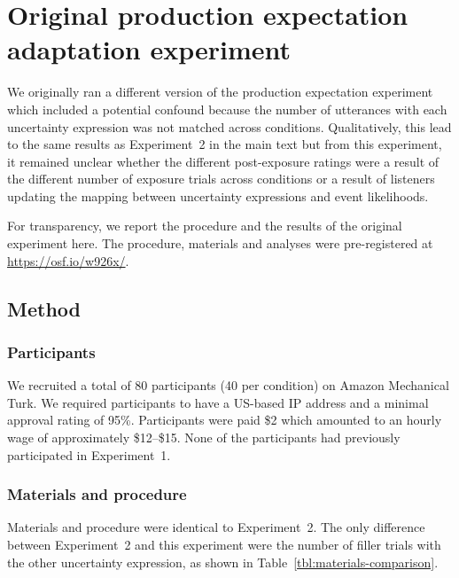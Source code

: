 \chapter[Original adaptation experiment]{Original production expectation adaptation experiment}


We originally ran a different version of the production expectation experiment which included a potential confound because the number of utterances
with each uncertainty expression was not matched across conditions. Qualitatively, this lead to the same results as Experiment~2 in the main text 
but from this experiment, it remained unclear whether the different post-exposure ratings were a result of the different number of exposure trials
across conditions or a result of listeners updating the mapping between uncertainty expressions and event likelihoods.  

For transparency, we report the procedure and the results of the original experiment here. The procedure, materials and analyses were pre-registered at \url{https://osf.io/w926x/}.

\section{Method}
\subsection{Participants}
We recruited a total of 80 participants (40 per condition) on Amazon Mechanical Turk. 
We required participants to have a US-based IP address and a minimal approval rating 
of 95\%. Participants were paid \$2 which amounted to an hourly wage of approximately 
\$12--\$15. None of the participants had previously participated in Experiment~1.

\subsection{Materials and procedure}

Materials and procedure were identical to Experiment~2. The only difference between Experiment~2 and this experiment were the number of filler trials with the other uncertainty expression, as shown in Table~\ref{tbl:materials-comparison}.

